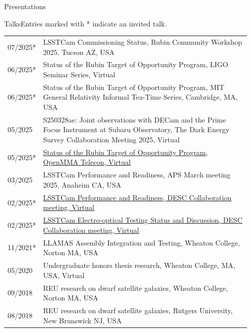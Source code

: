 \documentclass{resume} %
\begin{document}
\begin{rSection}{Presentations}
\begin{rSubsection}{Talks}{}{Entries marked with * indicate an invited talk.}{}
\begin{table}[h]
\begin{tabular}{p{0.07\linewidth} p{0.88\linewidth}}
07/2025* & LSSTCam Commissioning Status, Rubin Community Workshop 2025, Tucson AZ, USA\\
06/2025* & Status of the Rubin Target of Opportunity Program, LIGO Seminar Series, Virtual\\
06/2025* & Status of the Rubin Target of Opportunity Program, MIT General Relativity Informal Tea-Time Series, Cambridge, MA, USA\\
05/2025 & S250328ae: Joint observations with DECam and the Prime Focus Instrument at Subaru Observatory, The Dark Energy Survey Collaboration Meeting 2025, Virtual\\
05/2025* & \href{https://github.com/scimma/openMMA/wiki/Telecon20250522}{Status of the Rubin Target of Opportunity Program, OpenMMA Telecon, Virtual}\\
03/2025 & LSSTCam Performance and Readiness, APS March meeting 2025, Anaheim CA, USA\\
02/2025* & \href{https://docs.google.com/presentation/d/18RmTzV5id9RSE4_1xui-RJvK5FeGknrt8Ro1nBn32nk/edit?usp=sharing}{LSSTCam Performance and Readiness, DESC Collaboration meeting, Virtual}\\
02/2025* & \href{https://docs.google.com/presentation/d/12EPsuWSixo40_oqrDPNaXstYnqDzhI_2aFL2hd7IwTE/edit#slide=id.g2ade3bc380_0_0}{LSSTCam Electro-optical Testing Status and Discussion, DESC Collaboration meeting, Virtual}\\
11/2021* & LLAMAS Assembly Integration and Testing, Wheaton College, Norton MA, USA\\
05/2020 & Undergraduate honors thesis research, Wheaton College, MA, USA, Virtual\\ 
09/2018 & REU research on dwarf satellite galaxies, Wheaton College, Norton MA, USA\\
08/2018 & REU research on dwarf satellite galaxies, Rutgers University, New Brunswick NJ, USA\\
\end{tabular}
\end{table}
\end{rSubsection}


\end{rSection}
\end{document}
